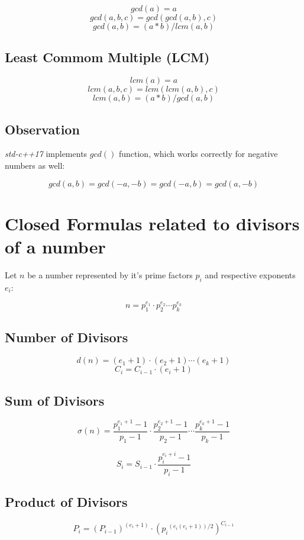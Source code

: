    $$ gcd(a) = a $$
    $$ gcd(a, b, c) = gcd( gcd(a, b), c ) $$ 
    $$ gcd(a, b) = (a*b) / lcm(a, b) $$

\subsection{Least Commom Multiple (LCM)}

    $$ lcm(a) = a $$
    $$ lcm(a, b, c) = lcm( lcm(a, b), c ) $$
    $$ lcm(a, b) = (a*b) / gcd(a, b) $$

\subsection{Observation}

\textit{std-c++17} implements $gcd()$ function, which works correctly for negative numbers as well:

$$ gcd(a,b) = gcd(-a,-b) = gcd(-a,b) = gcd(a,-b) $$

\section{Closed Formulas related to divisors of a number}

Let $n$ be a number represented by it's prime factors $p_i$ and respective exponents $e_i$:

$$ n = p_1^{e_1} \cdot p_2^{e_2} \cdots p_k^{e_k} $$

\subsection{Number of Divisors}

$$ d(n) = (e_1 + 1) \cdot (e_2 + 1) \cdots (e_k + 1) $$
$$ C_i = C_{i-1} \cdot (e_i + 1) $$

\subsection{Sum of Divisors}

$$ \sigma(n) = \frac{p_1^{e_1 + 1} - 1}{p_1 - 1} \cdot \frac{p_2^{e_2 + 1} - 1}{p_2 - 1} \cdots \frac{p_k^{e_k + 1} - 1}{p_k - 1} $$

$$ S_i = S_{i-1} \cdot \frac{p_i^{e_i + i} - 1}{p_i - 1} $$

\subsection{Product of Divisors}

$$ P_i = (P_{i-1})^{(e_i + 1)} \cdot ({p_i}^{(e_i(e_i + 1))/2})^{C_{i-1}} $$

